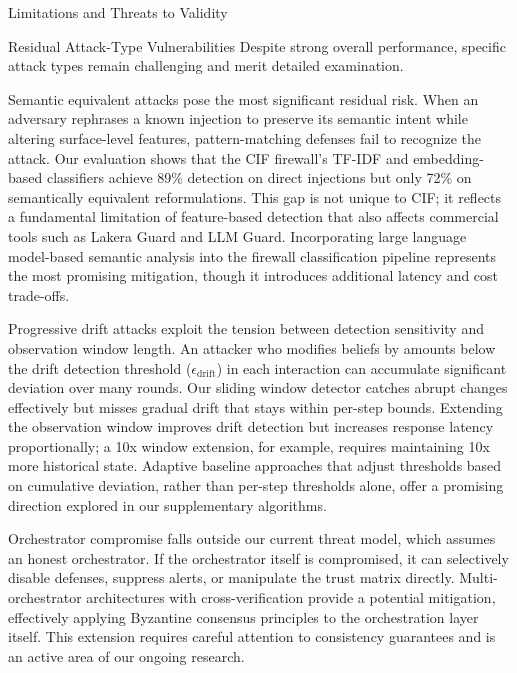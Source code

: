 \documentclass[
  ignorenonframetext,
]{beamer}
\begin{document}
\begin{frame}{Limitations and Threats to Validity}
\protect{}\label{limitations-and-threats-to-validity}
\begin{block}{Residual Attack-Type Vulnerabilities}
\protect{}\label{residual-attack-type-vulnerabilities}
Despite strong overall performance, specific attack types remain
challenging and merit detailed examination.

Semantic equivalent attacks pose the most significant residual risk.
When an adversary rephrases a known injection to preserve its semantic
intent while altering surface-level features, pattern-matching defenses
fail to recognize the attack. Our evaluation shows that the CIF
firewall's TF-IDF and embedding-based classifiers achieve 89\% detection
on direct injections but only 72\% on semantically equivalent
reformulations. This gap is not unique to CIF; it reflects a fundamental
limitation of feature-based detection that also affects commercial tools
such as Lakera Guard and LLM Guard. Incorporating large language
model-based semantic analysis into the firewall classification pipeline
represents the most promising mitigation, though it introduces
additional latency and cost trade-offs.

Progressive drift attacks exploit the tension between detection
sensitivity and observation window length. An attacker who modifies
beliefs by amounts below the drift detection threshold
(\(\epsilon_{\text{drift}}\)) in each interaction can accumulate
significant deviation over many rounds. Our sliding window detector
catches abrupt changes effectively but misses gradual drift that stays
within per-step bounds. Extending the observation window improves drift
detection but increases response latency proportionally; a 10x window
extension, for example, requires maintaining 10x more historical state.
Adaptive baseline approaches that adjust thresholds based on cumulative
deviation, rather than per-step thresholds alone, offer a promising
direction explored in our supplementary algorithms.

Orchestrator compromise falls outside our current threat model, which
assumes an honest orchestrator. If the orchestrator itself is
compromised, it can selectively disable defenses, suppress alerts, or
manipulate the trust matrix directly. Multi-orchestrator architectures
with cross-verification provide a potential mitigation, effectively
applying Byzantine consensus principles to the orchestration layer
itself. This extension requires careful attention to consistency
guarantees and is an active area of our ongoing research.
\end{block}


\end{frame}
\end{document}

